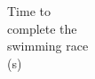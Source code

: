 \documentclass[preview]{standalone}
\begin{document}
\begin{center}
\textsf{Time to \\ complete the \\ swimming race \\ (s)}
\end{center}
\end{document}
